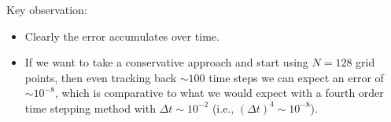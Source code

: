 Key observation:
\begin{itemize}
    \item Clearly the error accumulates over time. 
    \item If we want to take a conservative approach and start using 
            $N=128$ grid points, then even tracking back $\sim100$ time
            steps we can expect an error of $\sim 10^{-8}$, which is
            comparative to what we would expect with a fourth order time
            stepping method with $\Delta t \sim 10^{-2}$ 
            (i.e., $(\Delta t)^{4} \sim 10^{-8}$).
\end{itemize}

